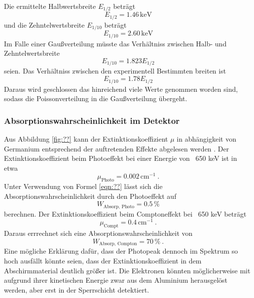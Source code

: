 Die ermittelte Halbwertsbreite $E_{1/2}$ beträgt
\begin{equation}
  E_{1/2} = 1.46 \, \text{keV}
\end{equation}
und die Zehntelwertsbreite $E_{1/10}$ beträgt
\begin{equation}
  E_{1/10} = 2.60 \, \text{keV}
\end{equation}
Im Falle einer Gaußverteilung müsste das Verhältniss zwischen Halb- und Zehntelwertsbreite
\begin{equation}
  E_{1/10} = 1.823 E_{1/2}
\end{equation}
seien. Das Verhältniss zwischen den experimentell Bestimmten breiten ist
\begin{equation}
  E_{1/10} = 1.78 E_{1/2}
  \label{eqn:Ver}
\end{equation}
Daraus wird geschlossen das hinreichend viele Werte genommen worden sind, sodass die Poissonverteilung in die Gaußverteilung übergeht.

\subsubsection{Absorptionswahrscheinlichkeit im Detektor}
Aus Abbildung \ref{fig:??} kann der Extinktionskoeffizient $\mu$ in abhängigkeit von Germanium entsprechend der auftretenden Effekte abgelesen werden . Der Extinktionskoeffizient beim Photoeffekt bei einer Energie von ~650 keV ist in etwa
\begin{equation}
  \mu_\text{Photo} = 0.002 \, \text{cm} ^{-1} \ .
  \label{eqn:muPhoto}
\end{equation}
Unter Verwendung von Formel \ref{eqn:??} lässt sich die Absorptionswahrscheinlichkeit durch den Photoeffekt auf
\begin{equation}
  W_\text{Absorp, Photo} = 0.5 \, \%
  \label{eqn:AbsorpPhoto}
\end{equation}
berechnen. Der Extinktionskoeffizient beim Comptoneffekt bei ~650 keV beträgt
\begin{equation}
  \mu_\text{Compt} = 0.4 \, \text{cm} ^{-1} \ .
  \label{eqn:muCompt}
\end{equation}
Daraus errrechnet sich eine Absorptionswahrscheinlichkeit von
\begin{equation}
  W_\text{Absorp, Compton} = 70 \, \% \ .
  \label{eqn:AbsorpComp}
\end{equation}
Eine mögliche Erklärung dafür, dass der Photopeak dennoch im Spektrum so hoch ausfällt könnte seien, dass der Extinktionskoeffizient in dem Abschirmmaterial deutlich größer ist. Die Elektronen könnten möglicherweise mit aufgrund ihrer kinetischen Energie zwar aus dem Aluminium herausgelöst werden, aber erst in der Sperrschicht detektiert.
